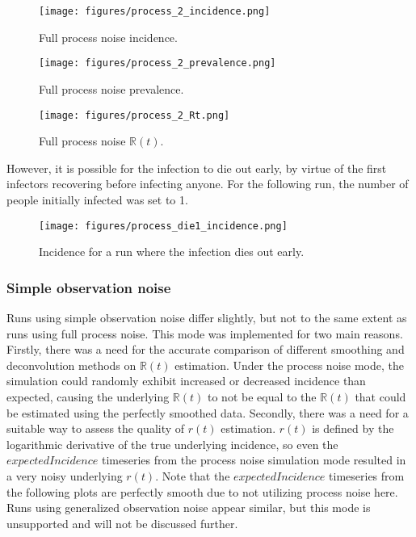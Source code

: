 \documentclass{article}
\newcommand{\nR}{\mathbb{R}}
\begin{document}
\begin{figure}[h!]
    \centering
    \texttt{[image: figures/process\_2\_incidence.png]}
    \caption{Full process noise incidence.}
\end{figure}

\clearpage
\begin{figure}[h!]
\centering
\texttt{[image: figures/process\_2\_prevalence.png]}
\caption{Full process noise prevalence.}
\end{figure}

\begin{figure}[h!]
\centering
\texttt{[image: figures/process\_2\_Rt.png]}
\caption{Full process noise $\nR(t)$.}
\end{figure}

However, it is possible for the infection to die out early, by virtue of the first infectors recovering before infecting anyone. For the following run, the number of people initially infected was set to 1.

\begin{figure}[h!]
\centering
\texttt{[image: figures/process\_die1\_incidence.png]}
\caption{Incidence for a run where the infection dies out early.}
\end{figure}

\subsubsection{Simple observation noise}
Runs using simple observation noise differ slightly, but not to the same extent as runs using full process noise. This mode was implemented for two main reasons. Firstly, there was a need for the accurate comparison of different smoothing and deconvolution methods on $\nR(t)$ estimation. Under the process noise mode, the simulation could randomly exhibit increased or decreased incidence than expected, causing the underlying $\nR(t)$ to not be equal to the $\nR(t)$ that could be estimated using the perfectly smoothed data. Secondly, there was a need for a suitable way to assess the quality of $r(t)$ estimation. $r(t)$ is defined by the logarithmic derivative of the true underlying incidence, so even the $expectedIncidence$ timeseries from the process noise simulation mode resulted in a very noisy underlying $r(t)$. Note that the $expectedIncidence$ timeseries from the following plots are perfectly smooth due to not utilizing process noise here. Runs using generalized observation noise appear similar, but this mode is unsupported and will not be discussed further.
\end{document}
